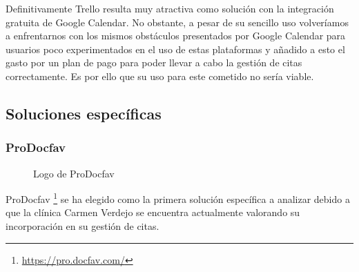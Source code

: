 Definitivamente Trello resulta muy atractiva como solución con la integración gratuita de Google Calendar. No obstante, a pesar de su sencillo uso volveríamos a enfrentarnos con los mismos obstáculos presentados por Google Calendar para usuarios poco experimentados en el uso de estas plataformas y añadido a esto el gasto por un plan de pago para poder llevar a cabo la gestión de citas correctamente. Es por ello que su uso para este cometido no sería viable.


\subsection{Soluciones específicas}

\subsubsection*{ProDocfav}

\begin{figure}[H]
    \caption{Logo de ProDocfav}
    \label{fig:docfav-logo}
\end{figure}

ProDocfav \footnote{\url{https://pro.docfav.com/}} se ha elegido como la primera solución específica a analizar debido a que la clínica Carmen Verdejo se encuentra actualmente valorando su incorporación en su gestión de citas. \bigskip

